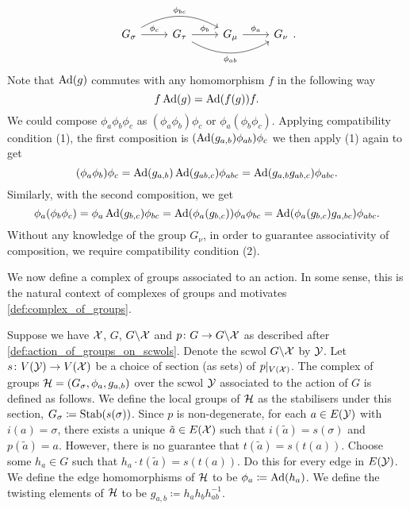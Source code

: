 \[
	\begin{tikzcd}
		G_\sigma \ar[r, "\phi_c"] \ar[rr, bend left, "\phi_{bc}"] & G_\tau \ar[r, "\phi_b"] \ar[rr, bend right, "\phi_{ab}"'] & G_\mu \ar[r, "\phi_a"] & G_\nu
	\end{tikzcd}
	.\]
Note that $\operatorname{Ad}(g)$ commutes with any homomorphism $f$ in the following way
\[
	f\operatorname{Ad}(g) = \operatorname{Ad}(f(g))f
	.\]
We could compose $\phi_a\phi_b\phi_c$ as $(\phi_a\phi_b)\phi_c$ or $\phi_a(\phi_b\phi_c)$.
Applying compatibility condition (1), the first composition is $(\operatorname{Ad}(g_{a,b})\phi_{ab})\phi_c$ we then apply (1) again to get
\[
	(\phi_a\phi_b)\phi_c = \operatorname{Ad}(g_{a,b})\operatorname{Ad}(g_{ab,c})\phi_{abc} = \operatorname{Ad}(g_{a,b}g_{ab,c})\phi_{abc}
	.\]
Similarly, with the second composition, we get
\[
	\phi_a(\phi_b\phi_c) = \phi_a\operatorname{Ad}(g_{b,c})\phi_{bc} = \operatorname{Ad}(\phi_a(g_{b,c}))\phi_a\phi_{bc} = \operatorname{Ad}(\phi_a(g_{b,c})g_{a,bc})\phi_{abc}
	.\]
Without any knowledge of the group $G_\nu$, in order to guarantee associativity of composition, we require compatibility condition (2).

We now define a complex of groups associated to an action.
In some sense, this is the natural context of complexes of groups and motivates  \cref{def:complex_of_groups}.
\begin{definition}
	Suppose we have $\mathcal{X}$, $G$, $G \backslash \mathcal{X}$ and $p \colon G \to G \backslash \mathcal{X}$ as described after \cref{def:action_of_groups_on_scwols}.
	Denote the scwol $G \backslash \mathcal{X}$ by $\mathcal{Y}$.
	Let $s \colon V(\mathcal{Y}) \to V(\mathcal{X})$ be a choice of section (as sets) of $p|_{V(\mathcal{X})}$.
	The complex of groups $\mathcal{H} = (G_\sigma, \phi_a, g_{a,b})$ over the scwol $\mathcal{Y}$ associated to the action of $G$ is defined as follows.
	We define the local groups of $\mathcal{H}$ as the stabilisers under this section, $G_\sigma \coloneqq \operatorname{Stab}(s(\sigma))$.
	Since $p$ is non-degenerate, for each $a \in E(\mathcal{Y})$ with $i(a) = \sigma$, there exists a unique $\tilde{a} \in E(\mathcal{X})$ such that $i(\tilde{a}) = s(\sigma)$ and $p(\tilde{a}) = a$.
	However, there is no guarantee that $t(\tilde{a}) = s(t(a))$.
	Choose some $h_a \in G$ such that $h_a \cdot t(\tilde{a}) = s(t(a))$.
	Do this for every edge in $E(\mathcal{Y})$.
	We define the edge homomorphisms of $\mathcal{H}$ to be $\phi_a \coloneqq \operatorname{Ad}(h_a)$.
	We define the twisting elements of $\mathcal{H}$ to be $g_{a,b} \coloneq h_ah_bh_{ab}^{-1}$.
	\label{def:complex_of_groups_from_action}
\end{definition}

